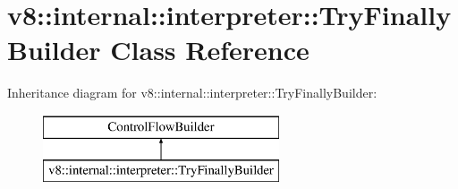 \hypertarget{classv8_1_1internal_1_1interpreter_1_1_try_finally_builder}{}\section{v8\+:\+:internal\+:\+:interpreter\+:\+:Try\+Finally\+Builder Class Reference}
\label{classv8_1_1internal_1_1interpreter_1_1_try_finally_builder}
Inheritance diagram for v8\+:\+:internal\+:\+:interpreter\+:\+:Try\+Finally\+Builder\+:\begin{figure}[H]
\begin{center}
\leavevmode
\includegraphics[height=2.000000cm]{classv8_1_1internal_1_1interpreter_1_1_try_finally_builder}
\end{center}
\end{figure}
